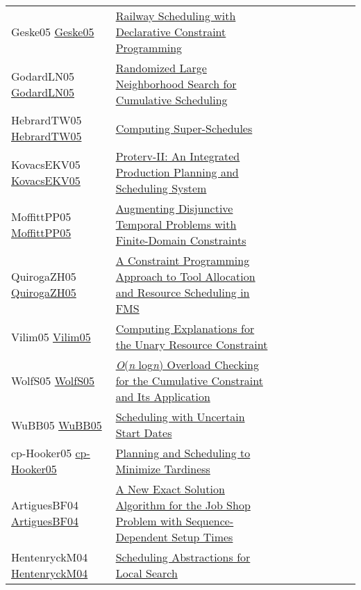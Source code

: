 {\begin{longtable}{p{3cm}p{7cm}lllllll}
Geske05 \href{https://doi.org/10.1007/11963578\_10}{Geske05} &  \href{papers/Geske05.pdf}{Railway Scheduling with Declarative Constraint Programming} &  &  &  &  &  &  & \\
GodardLN05 \href{http://www.aaai.org/Library/ICAPS/2005/icaps05-009.php}{GodardLN05} &  \href{}{Randomized Large Neighborhood Search for Cumulative Scheduling} &  &  &  &  &  &  & \\
HebrardTW05 \href{https://doi.org/10.1007/11564751\_117}{HebrardTW05} &  \href{papers/HebrardTW05.pdf}{Computing Super-Schedules} &  &  &  &  &  &  & \\
KovacsEKV05 \href{https://doi.org/10.1007/11564751\_118}{KovacsEKV05} &  \href{papers/KovacsEKV05.pdf}{Proterv-II: An Integrated Production Planning and Scheduling System} &  &  &  &  &  &  & \\
MoffittPP05 \href{http://www.aaai.org/Library/AAAI/2005/aaai05-188.php}{MoffittPP05} &  \href{papers/MoffittPP05.pdf}{Augmenting Disjunctive Temporal Problems with Finite-Domain Constraints} &  &  &  &  &  &  & \\
QuirogaZH05 \href{https://doi.org/10.1109/ROBOT.2005.1570686}{QuirogaZH05} &  \href{papers/QuirogaZH05.pdf}{A Constraint Programming Approach to Tool Allocation and Resource Scheduling in {FMS}} &  &  &  &  &  &  & \\
Vilim05 \href{https://doi.org/10.1007/11493853\_29}{Vilim05} &  \href{papers/Vilim05.pdf}{Computing Explanations for the Unary Resource Constraint} &  &  &  &  &  &  & \\
WolfS05 \href{https://doi.org/10.1007/11963578\_8}{WolfS05} &  \href{papers/WolfS05.pdf}{\emph{O}(\emph{n} log\emph{n}) Overload Checking for the Cumulative Constraint and Its Application} &  &  &  &  &  &  & \\
WuBB05 \href{https://doi.org/10.1007/11564751\_110}{WuBB05} &  \href{papers/WuBB05.pdf}{Scheduling with Uncertain Start Dates} &  &  &  &  &  &  & \\
cp-Hooker05 \href{https://doi.org/10.1007/11564751\_25}{cp-Hooker05} &  \href{papers/cp-Hooker05.pdf}{Planning and Scheduling to Minimize Tardiness} &  &  &  &  &  &  & \\
ArtiguesBF04 \href{https://doi.org/10.1007/978-3-540-24664-0\_3}{ArtiguesBF04} &  \href{papers/ArtiguesBF04.pdf}{A New Exact Solution Algorithm for the Job Shop Problem with Sequence-Dependent Setup Times} &  &  &  &  &  &  & \\
HentenryckM04 \href{https://doi.org/10.1007/978-3-540-24664-0\_22}{HentenryckM04} &  \href{papers/HentenryckM04.pdf}{Scheduling Abstractions for Local Search} &  &  &  &  &  &  & \\

\end{longtable}}
